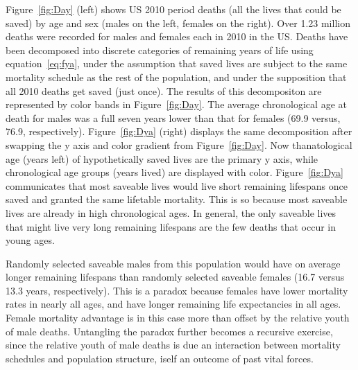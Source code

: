 \documentclass{article}
\begin{document}
Figure~\ref{fig:Day} (left) shows US 2010 period
deaths (all the lives that could be saved) by age and sex (males on the left,
females on the right). Over 1.23 million deaths were recorded for males
and females each in 2010 in the US. Deaths have been decomposed into discrete
categories of remaining years of life using equation~\eqref{eq:fya}, under the assumption that saved lives are subject to the same mortality schedule as the rest of the population, and under the supposition that all 2010 deaths get saved (just once). The results of this decompositon are represented by color bands in
Figure~\ref{fig:Day}. The average chronological age at death
for males was a full seven years lower than that for females
(69.9 versus, 76.9, respectively). Figure~\ref{fig:Dya} (right) displays the
same decomposition after swapping the y axis and color gradient from Figure~\ref{fig:Day}. Now thanatological age (years left) of hypothetically saved lives are the primary y axis, while chronological age groups (years lived) are displayed with color. Figure~\ref{fig:Dya} communicates that most saveable
lives would live short remaining lifespans once saved and granted the same lifetable
mortality. This is so because most saveable lives are already in high
chronological ages. In general, the only saveable lives that might live very
long remaining lifespans are the few deaths that occur in young ages. 

Randomly
selected saveable males from this population would have on average longer
remaining lifespans than randomly selected saveable females (16.7 versus 13.3 years,
respectively). This is a paradox because females have lower mortality rates in
nearly all ages, and have longer remaining life expectancies in all ages. Female
mortality advantage is in this case more than offset by the relative youth of
male deaths. Untangling the paradox further becomes a recursive exercise,
since the relative youth of male deaths is due an interaction between mortality
schedules and population structure, iself an outcome of past vital forces.
\end{document}
